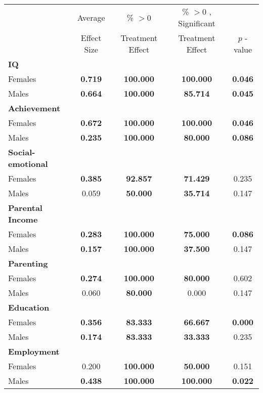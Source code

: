 \begin{tabular}{l c c c c}
\toprule
 & Average & \% $ >0 $ & \% $ >0 $ , Significant & \citet{Rosenbaum_2005_Distribution_JRSS} \\
 & Effect Size & Treatment Effect & Treatment Effect & $ p $ -value \\
\midrule
\textbf{IQ} & & & & \\
\quad Females &  \textbf{    0.719} & \textbf{  100.000} & \textbf{  100.000} & \textbf{ 0.046} \\
\quad Males &  \textbf{    0.664} & \textbf{  100.000} & \textbf{   85.714} & \textbf{ 0.045} \\
\midrule
\textbf{Achievement} & & & & \\
\quad Females &  \textbf{    0.672} & \textbf{  100.000} & \textbf{  100.000} & \textbf{ 0.046} \\
\quad Males &  \textbf{    0.235} & \textbf{  100.000} & \textbf{   80.000} & \textbf{ 0.086} \\
\midrule
\textbf{Social-emotional} & & & & \\
\quad Females &  \textbf{    0.385} & \textbf{   92.857} & \textbf{   71.429} & 0.235 \\
\quad Males &      0.059 & \textbf{   50.000} & \textbf{   35.714} & 0.147 \\
\midrule
\textbf{Parental Income} & & & & \\
\quad Females & \textbf{    0.283} & \textbf{  100.000} & \textbf{   75.000}  & \textbf{ 0.086} \\
\quad Males &  \textbf{    0.157} & \textbf{  100.000} & \textbf{   37.500}  & 0.147 \\
\midrule
\textbf{Parenting} & & & & \\
\quad Females &  \textbf{    0.274} & \textbf{  100.000} & \textbf{   80.000} & 0.602 \\
\quad Males &      0.060 & \textbf{   80.000} &     0.000 & 0.147 \\
\midrule
\textbf{Education} & & & & \\
\quad Females &  \textbf{    0.356} & \textbf{   83.333} & \textbf{   66.667} & \textbf{ 0.000} \\
\quad Males &  \textbf{    0.174} & \textbf{   83.333} & \textbf{   33.333} & 0.235 \\
\midrule
\textbf{Employment} & & & & \\
\quad Females &      0.200 & \textbf{  100.000} & \textbf{   50.000} & 0.151 \\
\quad Males &  \textbf{    0.438} & \textbf{  100.000} & \textbf{  100.000} & \textbf{ 0.022} \\

\end{tabular}
